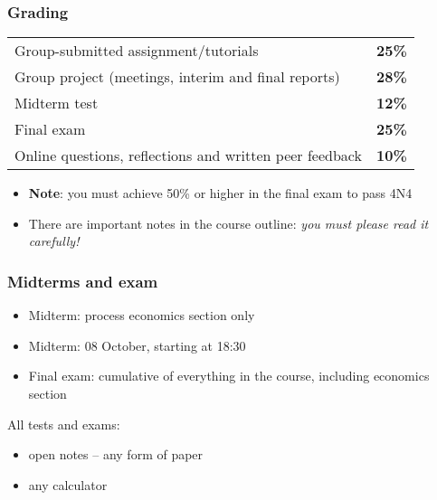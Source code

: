 \begin{frame}\frametitle{Grading}
	\begin{tabular}{lc}
		Group-submitted assignment/tutorials 					& \textbf{25\%} \\
		Group project (meetings, interim and final reports)		& \textbf{28\%} \\
		Midterm test											& \textbf{12\%} \\
		Final exam												& \textbf{25\%} \\
		Online questions, reflections and written peer feedback	& \textbf{10\%}
	\end{tabular}

	\vspace{24pt}
	\begin{itemize}
		\item	\textbf{Note}: you must achieve 50\% or higher in the final exam to pass 4N4
		\item	There are important notes in the course outline: \emph{{\color{myOrange}you must please read it carefully!}}
	\end{itemize}

\end{frame}

\begin{frame}\frametitle{Midterms and exam}

	\begin{itemize}
		\item	Midterm: process economics section only
		\item	Midterm: 08 October, starting at 18:30
		
		\vspace{12pt}
		\item	Final exam: cumulative of everything in the course, including economics section
	\end{itemize}

	\vspace{24pt}
	All tests and exams:
	\begin{itemize}
		\item	open notes -- any form of paper
		\item	any calculator
	\end{itemize}
\end{frame}

